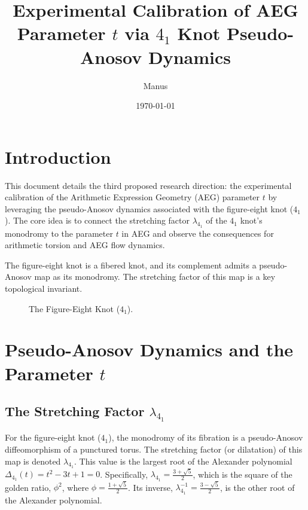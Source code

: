 \documentclass{article}
\title{Experimental Calibration of AEG Parameter $t$ via $4_1$ Knot Pseudo-Anosov Dynamics}
\author{Manus}
\date{\today}
\begin{document}
\maketitle

\section{Introduction}
This document details the third proposed research direction: the experimental calibration of the Arithmetic Expression Geometry (AEG) parameter $t$ by leveraging the pseudo-Anosov dynamics associated with the figure-eight knot ($4_1$). The core idea is to connect the stretching factor $\lambda_{4_1}$ of the $4_1$ knot's monodromy to the parameter $t$ in AEG and observe the consequences for arithmetic torsion and AEG flow dynamics.

The figure-eight knot is a fibered knot, and its complement admits a pseudo-Anosov map as its monodromy. The stretching factor of this map is a key topological invariant.

\begin{figure}[h!]
    \centering
    
    \caption{The Figure-Eight Knot ($4_1$).}
    \label{fig:knot_4_1_q3}
\end{figure}

\section{Pseudo-Anosov Dynamics and the Parameter $t$}

\subsection{The Stretching Factor $\lambda_{4_1}$}
For the figure-eight knot ($4_1$), the monodromy of its fibration is a pseudo-Anosov diffeomorphism of a punctured torus. The stretching factor (or dilatation) of this map is denoted $\lambda_{4_1}$. This value is the largest root of the Alexander polynomial $\Delta_{4_1}(t) = t^2 - 3t + 1 = 0$. 
Specifically, $\lambda_{4_1} = \frac{3 + \sqrt{5}}{2}$, which is the square of the golden ratio, $\phi^2$, where $\phi = \frac{1+\sqrt{5}}{2}$. Its inverse, $\lambda_{4_1}^{-1} = \frac{3 - \sqrt{5}}{2}$, is the other root of the Alexander polynomial.
\end{document}
